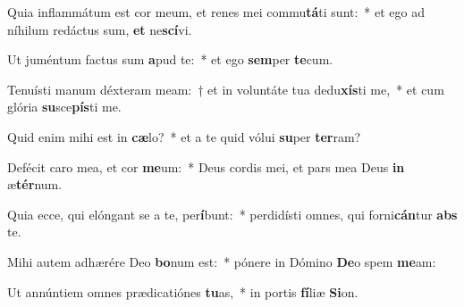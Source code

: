 \item Quia inflammátum est cor meum, et renes mei commu\textbf{tá}ti sunt:~* et ego ad níhilum redáctus sum, \textbf{et} ne\textbf{scí}vi.
\item Ut juméntum factus sum \textbf{a}pud te:~* et ego \textbf{sem}per \textbf{te}cum.
\item Tenuísti manum déxteram meam:~† et in voluntáte tua dedu\textbf{xís}ti me,~* et cum glória \textbf{su}sce\textbf{pís}ti me.
\item Quid enim mihi est in \textbf{cæ}lo?~* et a te quid vólui \textbf{su}per \textbf{ter}ram?
\item Defécit caro mea, et cor \textbf{me}um:~* Deus cordis mei, et pars mea Deus \textbf{in} æ\textbf{tér}num.
\item Quia ecce, qui elóngant se a te, per\textbf{í}bunt:~* perdidísti omnes, qui forni\textbf{cán}tur \textbf{abs} te.
\item Mihi autem adhærére Deo \textbf{bo}num est:~* pónere in Dómino \textbf{De}o spem \textbf{me}am:
\item Ut annúntiem omnes prædicatiónes \textbf{tu}as,~* in portis \textbf{fí}liæ \textbf{Si}on.

